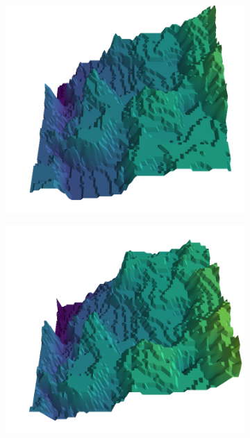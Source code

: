 \begin{figure}[H]
    \begin{subfigure}[b]{0.19\textwidth}
        \includegraphics[width=\linewidth]{../img/5/quarry/worst//patch-3d-majavi-colormap-2.png}
    \end{subfigure}
    \begin{subfigure}[b]{0.19\textwidth}
        \includegraphics[width=\linewidth]{../img/5/quarry/worst//patch-3d-majavi-colormap-3.png}
    \end{subfigure}  

\end{figure}
